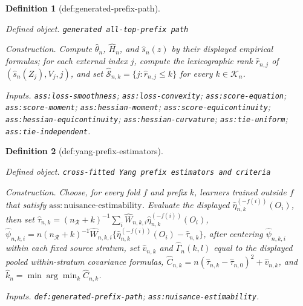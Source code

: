 \documentclass{article}
\newtheorem{definition}{Definition}
\begin{document}
\begin{definition}[def:generated-prefix-path]\label{def:generated-prefix-path}
\par\smallskip\noindent\emph{Defined object.} \texttt{generated all-\allowbreak{}top-\allowbreak{}prefix path}
\par\smallskip\noindent\emph{Construction.} Compute \(\widehat\theta_n\), \(\widehat H_n\), and \(\widehat s_n(z)\) by their displayed empirical formulas; for each external index \(j\), compute the lexicographic rank \(\widehat r_{n,j}\) of \((\widehat s_n(Z_j),V_j,j)\), and set \(\widehat{\mathcal S}_{n,k}=\{j:\widehat r_{n,j}\le k\}\) for every \(k\in\mathcal K_n\).
\par\smallskip\noindent\emph{Inputs.} \texttt{ass:\allowbreak{}loss-\allowbreak{}smoothness}; \texttt{ass:\allowbreak{}loss-\allowbreak{}convexity}; \texttt{ass:\allowbreak{}score-\allowbreak{}equation}; \texttt{ass:\allowbreak{}score-\allowbreak{}moment}; \texttt{ass:\allowbreak{}hessian-\allowbreak{}moment}; \texttt{ass:\allowbreak{}score-\allowbreak{}equicontinuity}; \texttt{ass:\allowbreak{}hessian-\allowbreak{}equicontinuity}; \texttt{ass:\allowbreak{}hessian-\allowbreak{}curvature}; \texttt{ass:\allowbreak{}tie-\allowbreak{}uniform}; \texttt{ass:\allowbreak{}tie-\allowbreak{}independent}.
\end{definition}

\begin{definition}[def:yang-prefix-estimators]\label{def:yang-prefix-estimators}
\par\smallskip\noindent\emph{Defined object.} \texttt{cross-\allowbreak{}fitted Yang prefix estimators and criteria}
\par\smallskip\noindent\emph{Construction.} Choose, for every fold \(f\) and prefix \(k\), learners trained outside \(f\) that satisfy \(\mathrm{ass:nuisance\text{-}estimability}\). Evaluate the displayed \(\widehat\eta_{n,k}^{(-f(i))}(O_i)\), then set \(\widehat\tau_{n,k}=(n_{\mathcal R}+k)^{-1}\sum_i\widehat W_{n,k,i}\widehat\eta_{n,k}^{(-f(i))}(O_i)\), \(\widehat\psi_{n,k,i}=n(n_{\mathcal R}+k)^{-1}\widehat W_{n,k,i}\{\widehat\eta_{n,k}^{(-f(i))}(O_i)-\widehat\tau_{n,k}\}\), after centering \(\widehat\psi_{n,k,i}\) within each fixed source stratum, set \(\widehat v_{n,k}\) and \(\widehat\Gamma_n(k,l)\) equal to the displayed pooled within-stratum covariance formulas, \(\widehat C_{n,k}=n(\widehat\tau_{n,k}-\widehat\tau_{n,0})^2+\widehat v_{n,k}\), and \(\widehat k_n=\min\arg\min_k\widehat C_{n,k}\).
\par\smallskip\noindent\emph{Inputs.} \texttt{def:\allowbreak{}generated-\allowbreak{}prefix-\allowbreak{}path}; \texttt{ass:\allowbreak{}nuisance-\allowbreak{}estimability}.
\end{definition}
\end{document}
